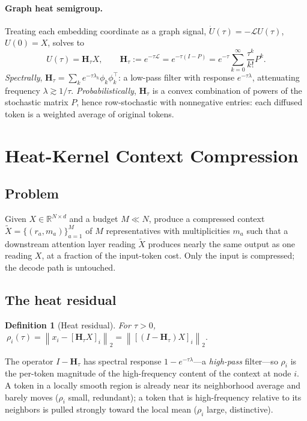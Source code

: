 \documentclass[11pt]{article}
\newtheorem{definition}{Definition}
\newcommand{\R}{\mathbb{R}}
\newcommand{\rwL}{\mathcal{L}}
\newcommand{\Hop}{\mathbf{H}}
\newcommand{\norm}[1]{\left\lVert#1\right\rVert}
\begin{document}
\paragraph{Graph heat semigroup.}
Treating each embedding coordinate as a graph signal, $\dot U(\tau)=-\rwL U(\tau)$, $U(0)=X$,
solves to
\begin{equation}
\label{eq:heat}
U(\tau)=\Hop_\tau X,\qquad
\Hop_\tau:=e^{-\tau\rwL}=e^{-\tau(I-P)}=e^{-\tau}\sum_{k=0}^{\infty}\frac{\tau^k}{k!}P^k .
\end{equation}
\emph{Spectrally}, $\Hop_\tau=\sum_k e^{-\tau\lambda_k}\phi_k\phi_k^\top$: a low-pass filter with
response $e^{-\tau\lambda}$, attenuating frequency $\lambda\gtrsim 1/\tau$.
\emph{Probabilistically}, $\Hop_\tau$ is a convex combination of powers of the stochastic matrix
$P$, hence row-stochastic with nonnegative entries: each diffused token is a weighted average of
original tokens.

\section{Heat-Kernel Context Compression}
\label{sec:method}

\subsection{Problem}
Given $X\in\R^{N\times d}$ and a budget $M\ll N$, produce a compressed context
$\widetilde X=\{(r_a,m_a)\}_{a=1}^{M}$ of $M$ representatives with multiplicities $m_a$ such that
a downstream attention layer reading $\widetilde X$ produces nearly the same output as one
reading $X$, at a fraction of the input-token cost. Only the input is compressed; the decode path
is untouched.

\subsection{The heat residual}
\begin{definition}[Heat residual]
For $\tau>0$, $\ \rho_i(\tau)=\norm{x_i-[\Hop_\tau X]_i}_2=\norm{[(I-\Hop_\tau)X]_i}_2 .$
\end{definition}
The operator $I-\Hop_\tau$ has spectral response $1-e^{-\tau\lambda}$---a \emph{high-pass}
filter---so $\rho_i$ is the per-token magnitude of the high-frequency content of the context at
node $i$. A token in a locally smooth region is already near its neighborhood average and barely
moves ($\rho_i$ small, redundant); a token that is high-frequency relative to its neighbors is
pulled strongly toward the local mean ($\rho_i$ large, distinctive).
\end{document}
